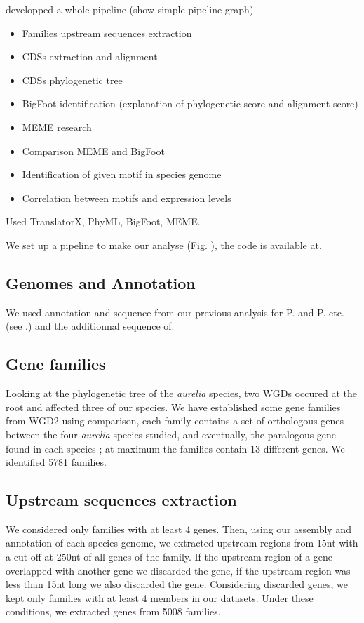 \begin{materials}

developped a whole pipeline (show simple pipeline graph)
\begin{itemize}
\item Families upstream sequences extraction
\item CDSs extraction and alignment
\item CDSs phylogenetic tree
\item BigFoot identification (explanation of phylogenetic score and alignment score)
\item MEME research
\item Comparison MEME and BigFoot
\item Identification of given motif in species genome
\item Correlation between motifs and expression levels
\end{itemize}

Used TranslatorX, PhyML, BigFoot, MEME.

We set up a pipeline to make our analyse (Fig. ), the code is available at.

\subsection{Genomes and Annotation}

We used annotation and sequence from our previous analysis for P. and P. etc. (see .) and the additionnal sequence of.

\subsection{Gene families}

Looking at the phylogenetic tree of the \textit{aurelia} species, two WGDs occured at the root and affected three of our species. We have established some gene families from WGD2 using comparison, each family contains a set of orthologous genes between the four \textit{aurelia} species studied, and eventually, the paralogous gene found in each species ; at maximum the families contain 13 different genes. We identified 5781 families.

\subsection{Upstream sequences extraction}

We considered only families with at least 4 genes. Then, using our assembly and annotation of each species genome, we extracted upstream regions from 15nt with a cut-off at 250nt of all genes of the family. If the upstream region of a gene overlapped with another gene we discarded the gene, if the upstream region was less than 15nt long we also discarded the gene. Considering discarded genes, we kept only families with at least 4 members in our datasets. Under these conditions, we extracted genes from 5008 families.


\end{materials}
